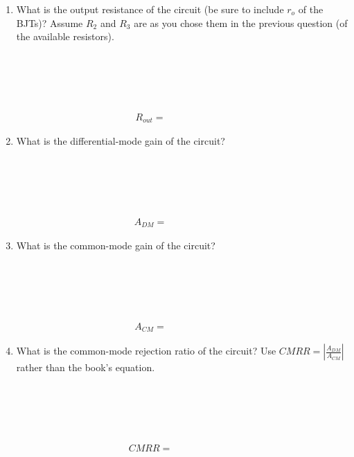 \documentclass{article}
\begin{document}
\begin{enumerate}
  \item What is the output resistance of the circuit (be sure to include $r_o$ of the BJTs)? Assume $R_2$ and $R_3$ are as you chose them in the previous question (of the available resistors). \\~\\~\\~\\~\\~\\
    \begin{align*}
      \boxed{R_{out} = ~~~~~~~~~~~~~~~~~~~~~~~~~~~~~~}
    \end{align*}

  \item What is the differential-mode gain of the circuit? \\~\\~\\~\\~\\~\\
    \begin{align*}
      \boxed{A_{DM} = ~~~~~~~~~~~~~~~~~~~~~~~~~~~~~~}
    \end{align*}

  \item What is the common-mode gain of the circuit? \\~\\~\\~\\~\\~\\
    \begin{align*}
      \boxed{A_{CM} = ~~~~~~~~~~~~~~~~~~~~~~~~~~~~~~}
    \end{align*}

  \item What is the common-mode rejection ratio of the circuit? Use $CMRR = \left|\frac{A_{DM}}{A_{CM}}\right|$ rather than the book's equation. \\~\\~\\~\\~\\~\\
    \begin{align*}
      \boxed{CMRR = ~~~~~~~~~~~~~~~~~~~~~~~~~~~~~~}
    \end{align*}

\end{enumerate}
\end{document}
